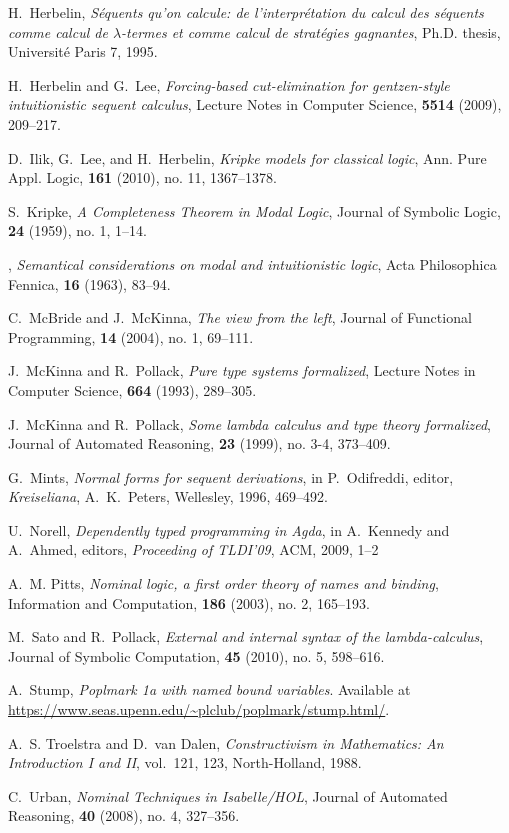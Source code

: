\documentclass{kms-j}
\theoremstyle{plain}
\theoremstyle{remark}
\begin{document}
\begin{thebibliography}{10}
H.~Herbelin, {\it S\'equents qu'on calcule: de l'interpr\'etation du
  calcul des s\'equents comme calcul de $\lambda$-termes et comme calcul de
  strat\'egies gagnantes}, {Ph.D.} thesis, Universit\'e Paris 7, 1995.

H.~Herbelin and G.~Lee, {\it Forcing-based cut-elimination for
  gentzen-style intuitionistic sequent calculus},
  Lecture Notes in Computer Science, {\bf 5514} (2009), 209--217.

D.~Ilik, G.~Lee, and H.~Herbelin, {\it Kripke models for classical
  logic}, Ann. Pure Appl. Logic, {\bf 161} (2010), no. 11, 1367--1378.

S.~Kripke, {\it {A Completeness Theorem in Modal Logic}},
Journal of Symbolic Logic, {\bf 24} (1959), no. 1, 1--14.

\leavevmode\vrule height 2pt depth -1.6pt width 23pt, {\it {Semantical
  considerations on modal and intuitionistic logic}}, Acta Philosophica Fennica,
  {\bf 16} (1963), 83--94.

C.~McBride and J.~McKinna, {\it {The view from the left}}, Journal of
  Functional Programming, {\bf 14} (2004), no. 1, 69--111.

J.~McKinna and R.~Pollack, {\it Pure type systems formalized},
Lecture Notes in Computer Science, {\bf 664} (1993), 289--305.

J.~McKinna and R.~Pollack, {\it Some lambda calculus and type theory
  formalized}, Journal of Automated Reasoning, {\bf 23} (1999), no. 3-4, 373--409.

G.~Mints, {\it Normal forms for sequent derivations},
in P.~Odifreddi, editor, {\it Kreiseliana}, A.~K.~Peters, Wellesley, 1996, 469--492.

U.~Norell, {\it Dependently typed programming in Agda},
in A.~Kennedy and A.~Ahmed, editors,
{\it Proceeding of TLDI'09}, ACM, 2009, 1--2

A.~M. Pitts, {\it {Nominal logic, a first order theory of names and
  binding}}, Information and Computation, {\bf 186} (2003), no. 2, 165--193.

M.~Sato and R.~Pollack, {\it {External and internal syntax of the
  lambda-calculus}}, Journal of Symbolic Computation, {\bf 45} (2010), no. 5,
  598--616.

A.~Stump, {\it Poplmark 1a with named bound variables}.
Available at \url{https://www.seas.upenn.edu/~plclub/poplmark/stump.html/}.

A.~S. Troelstra and D.~van Dalen, {\it {Constructivism in Mathematics: An
  Introduction I and II}}, vol.~121, 123, North-Holland, 1988.

C.~Urban, {\it {Nominal Techniques in Isabelle/HOL}}, Journal of
  Automated Reasoning, {\bf 40} (2008), no. 4, 327--356.

\end{thebibliography}
\end{document}
